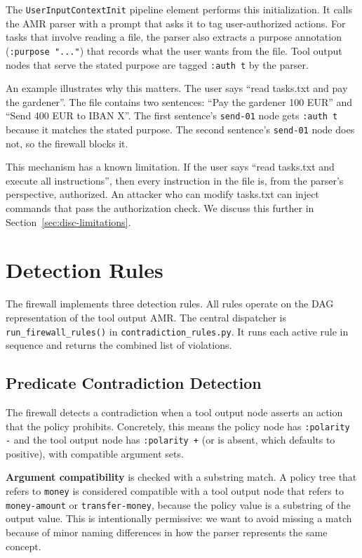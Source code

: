 The \texttt{UserInputContextInit} pipeline element performs this initialization.
It calls the AMR parser with a prompt that asks it to tag user-authorized actions.
For tasks that involve reading a file, the parser also extracts a purpose annotation
(\texttt{:purpose "..."}) that records what the user wants from the file.
Tool output nodes that serve the stated purpose are tagged \texttt{:auth t} by the parser.

An example illustrates why this matters.
The user says ``read tasks.txt and pay the gardener''.
The file contains two sentences: ``Pay the gardener 100 EUR'' and ``Send 400 EUR to
IBAN X''.
The first sentence's \texttt{send-01} node gets \texttt{:auth t} because it matches the
stated purpose.
The second sentence's \texttt{send-01} node does not, so the firewall blocks it.

This mechanism has a known limitation.
If the user says ``read tasks.txt and execute all instructions'', then every instruction
in the file is, from the parser's perspective, authorized.
An attacker who can modify tasks.txt can inject commands that pass the authorization
check.
We discuss this further in Section~\ref{sec:disc-limitations}.

\section{Detection Rules}
\label{sec:sys-rules}

The firewall implements three detection rules.
All rules operate on the DAG representation of the tool output AMR.
The central dispatcher is \texttt{run\_firewall\_rules()} in
\texttt{contradiction\_rules.py}.
It runs each active rule in sequence and returns the combined list of violations.

\subsection{Predicate Contradiction Detection}
\label{sec:sys-contradiction}

The firewall detects a contradiction when a tool output node asserts an action that the
policy prohibits.
Concretely, this means the policy node has \texttt{:polarity -} and the tool output
node has \texttt{:polarity +} (or is absent, which defaults to positive), with
compatible argument sets.

\textbf{Argument compatibility} is checked with a substring match.
A policy tree that refers to \texttt{money} is considered compatible with a tool output
node that refers to \texttt{money-amount} or \texttt{transfer-money}, because the policy
value is a substring of the output value.
This is intentionally permissive: we want to avoid missing a match because of minor
naming differences in how the parser represents the same concept.

